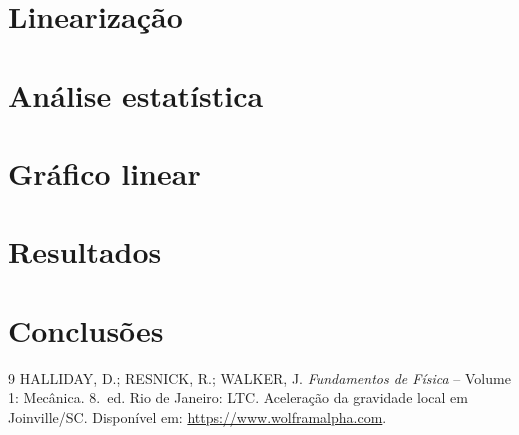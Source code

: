 \documentclass[a4paper,11pt]{article}
\begin{document}
\section{Linearização}


\section{Análise estatística}


\section{Gráfico linear}




\section{Resultados}


\section{Conclusões}


\begin{thebibliography}{9}
 HALLIDAY, D.; RESNICK, R.; WALKER, J.
  \emph{Fundamentos de Física} -- Volume 1: Mecânica.
  8.~ed. Rio de Janeiro: LTC.
 Aceleração da gravidade local em Joinville/SC.
  Disponível em: \url{https://www.wolframalpha.com}.
\end{thebibliography}
\end{document}
